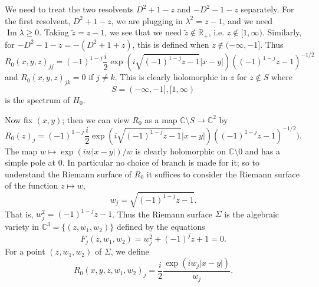 \documentclass[12pt]{report}
\newcommand{\RR}{\mathbb{R}}
\newcommand{\CC}{\mathbb{C}}
\renewcommand{\Im}{\operatorname{Im}}
\theoremstyle{definition}
\begin{document}
We need to treat the two resolvents $D^2 + 1 - z$ and $-D^2 - 1 - z$ separately.
For the first resolvent, $D^2 + 1 - z$, we are plugging in $\lambda^2 = z - 1$, and we need $\Im \lambda \geq 0$.
Taking $\widetilde z = z - 1$, we see that we need $\widetilde z \notin \RR_+$, i.e. $z \notin [1, \infty)$.
Similarly, for $-D^2 - 1 - z = -(D^2 + 1 + z)$, this is defined when $z \notin (-\infty, -1]$. Thus
$$R_0(x, y, z)_{jj} = (-1)^{1-j}\frac{i}{2} \exp(i\sqrt{(-1)^{1-j}z -1}|x-y|)((-1)^{1-j}z -1)^{-1/2}$$
and $R_0(x,y,z)_{jk} = 0$ if $j \neq k$.
This is clearly holomorphic in $z$ for $z \notin S$ where
$$S = (-\infty, -1], [1, \infty)$$
is the spectrum of $H_0$.

Now fix $(x, y)$; then we can view $R_0$ as a map $\CC \setminus S \to \CC^2$ by
$$R_0(z)_j = (-1)^{1-j} \frac{i}{2} \exp(i\sqrt{(-1)^{1-j}z -1}|x-y|)((-1)^{1-j}z -1)^{-1/2}).$$
The map $w \mapsto \exp(iw|x-y|)/w$ is clearly holomorphic on $\CC \setminus 0$ and has a simple pole at $0$.
In particular no choice of branch is made for it; so to understand the Riemann surface of $R_0$ it suffices to consider the Riemann surface of the function $z \mapsto w$,
$$w_j = \sqrt{(-1)^{1-j}z-1}.$$
That is, $w_j^2 = (-1)^{1-j}z - 1$. Thus the Riemann surface $\Sigma$ is the algebraic variety in $\CC^3 = \{(z, w_1, w_2)\}$ defined by the equations
$$F_j(z, w_1, w_2) = w_j^2 + (-1)^jz + 1 = 0.$$
For a point $(z, w_1, w_2)$ of $\Sigma$, we define
$$R_0(x, y, z, w_1, w_2)_j = \frac{i}{2} \frac{\exp(iw_j|x-y|)}{w_j}.$$
\end{document}
